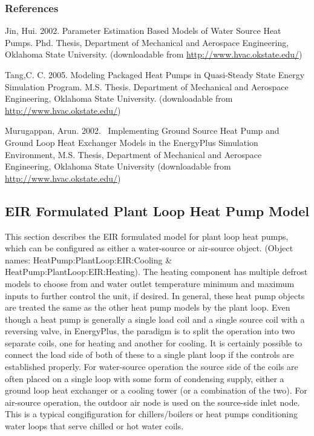 \subsubsection{References}\label{references-1}

Jin, Hui. 2002. Parameter Estimation Based Models of Water Source Heat Pumps. Phd. Thesis, Department of Mechanical and Aerospace Engineering, Oklahoma State University. (downloadable from \href{http://www.hvac.okstate.edu}{http://www.hvac.okstate.edu/})

Tang,C. C. 2005. Modeling Packaged Heat Pumps in Quasi-Steady State Energy Simulation Program. M.S. Thesis. Department of Mechanical and Aerospace Engineering, Oklahoma State University. (downloadable from \href{http://www.hvac.okstate.edu}{http://www.hvac.okstate.edu/})

Murugappan, Arun. 2002.~ Implementing Ground Source Heat Pump and Ground Loop Heat Exchanger Models in the EnergyPlus Simulation Environment, M.S. Thesis, Department of Mechanical and Aerospace Engineering, Oklahoma State University (downloadable from \href{http://www.hvac.okstate.edu}{http://www.hvac.okstate.edu/})

\subsection{EIR Formulated Plant Loop Heat Pump Model}\label{eir-plant-loop-heat-pump-model}

This section describes the EIR formulated model for plant loop heat pumps, which can be configured as either a water-source or air-source object. (Object names: HeatPump:PlantLoop:EIR:Cooling \& HeatPump:PlantLoop:EIR:Heating). The heating component has multiple defrost models to choose from and water outlet temperature minimum and maximum inputs to further control the unit, if desired. In general, these heat pump objects are treated the same as the other heat pump models by the plant loop.  Even though a heat pump is generally a single load coil and a single source coil with a reversing valve, in EnergyPlus, the paradigm is to split the operation into two separate coils, one for heating and another for cooling.  It is certainly possible to connect the load side of both of these to a single plant loop if the controls are established properly.  For water-source operation the source side of the coils are often placed on a single loop with some form of condensing supply, either a ground loop heat exchanger or a cooling tower (or a combination of the two). For air-source operation, the outdoor air node is used on the source-side inlet node. This is a typical congifiguration for chillers/boilers or heat pumps conditioning water loops that serve chilled or hot water coils.

